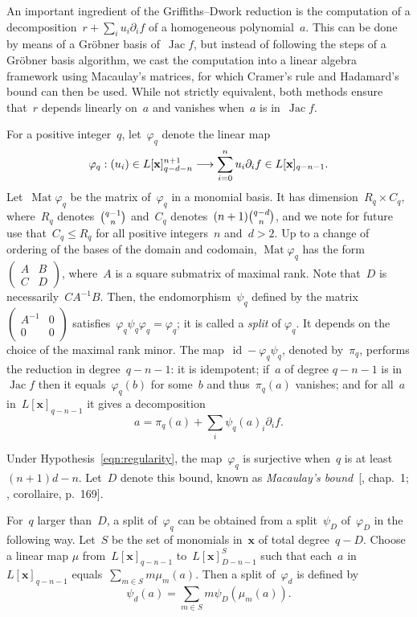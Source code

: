 \documentclass{sig-alternate}
\newcommand{\Lx}{L[\mathbf x]}
\DeclareMathOperator{\Jac}{Jac}
\DeclareMathOperator{\id}{id}
\DeclareMathOperator{\Mat}{Mat}
\newcommand{\xx}{\mathbf{x}}
\begin{document}
\noindent An important ingredient of the Griffiths--Dwork reduction is the computation of a
decomposition~$r+\sum_i u_i\partial_if$ of a homogeneous polynomial~$a$.  This
can be done by means of a Gröbner basis of~$\Jac f$, but instead of following
the steps of a Gr\"obner basis algorithm, we cast the computation into a linear
algebra framework using Macaulay's matrices, for which Cramer's rule and
Hadamard's bound can then be used.
While not strictly equivalent, both methods ensure that~$r$ depends linearly on~$a$ and vanishes when~$a$ is in~$\Jac f$.

For a positive integer~$q$, let~$\varphi_q$ denote the linear map
\[ \varphi_q :  (u_i) \in \Lx_{q-d-n}^{n+1} \longrightarrow \sum_{i=0}^{\smash{n}} u_i\partial_i f \in \Lx_{q-n-1}. \]
Let~$\Mat \varphi_q$ be the matrix of~$\varphi_q$ in a monomial basis.
It has dimension~$R_q \times C_q$, where~$R_{q}$ denotes~$\tbinom{q-1}{n}$ and~$C_{q}$ denotes~$(n+1)\tbinom{q-d}{n}$,
and we note for future use that~$C_{q}\leqslant R_{q}$ for all positive integers~$n$ and~$d>2$.
Up to a change of ordering of the bases of the domain and codomain, $\Mat \varphi_q$ has the form $\left(\begin{smallmatrix} A & B \\ C & D \end{smallmatrix}\right)$,
where~$A$ is a  square submatrix of maximal rank.
Note that~$D$ is necessarily~$CA^{-1}B$.
Then, the endomorphism~$\psi_q$ defined by the matrix~$\left(\begin{smallmatrix} A^{-1} & 0 \\ 0 & 0 \end{smallmatrix}\right)$
satisfies~$\varphi_q \psi_q \varphi_q = \varphi_q$; it is called a \emph{split} of $\varphi_q$.
It depends on the choice of the maximal rank minor.
The map~$\id - \varphi_q \psi_q$, denoted by~$\pi_q$, performs the reduction in degree~$q-n-1$: it is idempotent;
if~$a$ of degree $q-n-1$ is in~$\Jac f$ then it equals~$\varphi_q(b)$ for some~$b$ and thus~$\pi_q(a)$ vanishes;
and for all~$a$ in~$\Lx_{q-n-1}$ it gives a decomposition
\[ a = \pi_q(a) + \sum_i \psi_q(a)_i \partial_i f. \]



Under Hypothesis~\eqref{eqn:regularity}, the map~$\varphi_q$ is surjective when~$q$ is at least~$(n+1)d - n$.
Let~$D$ denote this bound, known as \emph{Macaulay's bound}~[, chap.~1; , corollaire, p.~169]. 

For~$q$ larger than~$D$, a split of~$\varphi_q$ can be obtained from a split~$\psi_{D}$ of~$\varphi_{D}$ in the following way.
Let~$S$ be the set of monomials in~$\xx$ of total degree~$q-D$.
Choose a linear map $\mu$ from~$\Lx_{q-n-1}$ to~$\Lx_{D-n-1}^S$ such that each~$a$ in~$\Lx_{q-n-1}$ equals~$\sum_{m\in S} m \mu_m(a)$.
Then a split of~$\varphi_d$ is defined by
\[ \psi_d(a) = \sum_{m\in S} m \psi_{D}(\mu_m(a)).\]
\end{document}
